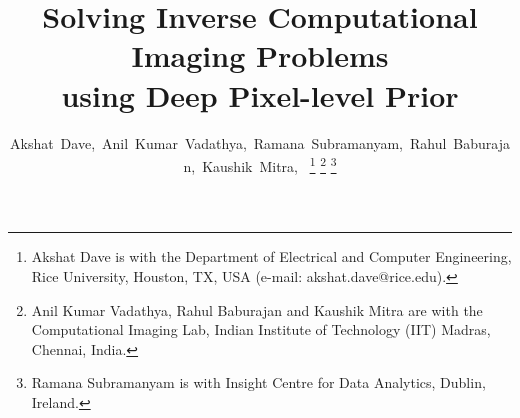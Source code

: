\documentclass[journal,twoside]{IEEEtran}
\begin{document}
%
\title{Solving Inverse Computational Imaging Problems \\ using Deep Pixel-level Prior}
%
%
%

\author{Akshat~Dave,~Anil~Kumar~Vadathya,~Ramana~Subramanyam,~Rahul~Baburajan,~Kaushik~Mitra,~ %
\thanks{Akshat Dave is with the Department of Electrical and Computer Engineering, Rice University, Houston, TX, USA (e-mail: akshat.dave@rice.edu).}%
\thanks{Anil Kumar Vadathya, Rahul Baburajan and Kaushik Mitra are with the Computational Imaging Lab, Indian Institute of Technology (IIT) Madras, Chennai, India.}%
\thanks{Ramana Subramanyam is with Insight Centre for Data Analytics, Dublin, Ireland.}}

% 
%



% 
\end{document}
